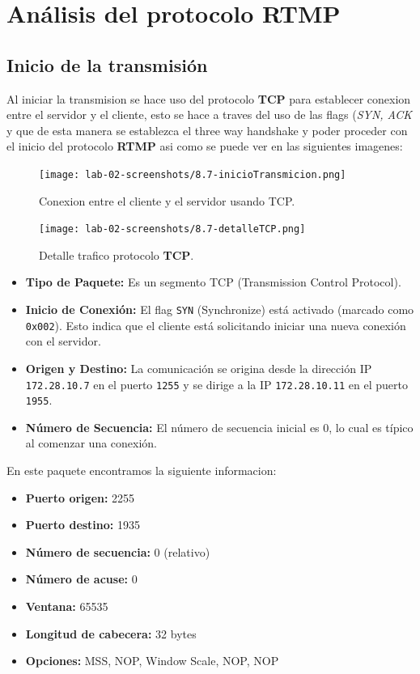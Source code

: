 \documentclass[10pt]{article}
\begin{document}
\section{Análisis del protocolo RTMP}
\subsection{Inicio de la transmisión}

Al iniciar la transmision se hace uso del protocolo \textbf{TCP} para establecer conexion entre el servidor y el cliente, esto se hace a traves del uso de las flags (\textit{SYN, ACK} y que de esta manera se establezca el three way handshake y poder proceder con el inicio del protocolo \textbf{RTMP} asi como se puede ver en las siguientes imagenes:

\begin{figure}[H]
    \centering
    \texttt{[image: lab-02-screenshots/8.7-inicioTransmicion.png]}
    \caption{Conexion entre el cliente y el servidor usando TCP.}
\end{figure}
\begin{figure}[H]
    \centering
    \texttt{[image: lab-02-screenshots/8.7-detalleTCP.png]}
    \caption{Detalle trafico protocolo \textbf{TCP}.}
\end{figure}

\begin{itemize}
    \item \textbf{Tipo de Paquete:} Es un segmento TCP (Transmission Control Protocol).
    \item \textbf{Inicio de Conexión:} El flag \texttt{SYN} (Synchronize) está activado (marcado como \texttt{0x002}). Esto indica que el cliente está solicitando iniciar una nueva conexión con el servidor.
    \item \textbf{Origen y Destino:} La comunicación se origina desde la dirección IP \texttt{172.28.10.7} en el puerto \texttt{1255} y se dirige a la IP \texttt{172.28.10.11} en el puerto \texttt{1955}.
    \item \textbf{Número de Secuencia:} El número de secuencia inicial es 0, lo cual es típico al comenzar una conexión.
\end{itemize}
En este paquete encontramos la siguiente informacion:
\begin{itemize}
    \item \textbf{Puerto origen:} 2255
    \item \textbf{Puerto destino:} 1935
    \item \textbf{Número de secuencia:} 0 (relativo)
    \item \textbf{Número de acuse:} 0
    \item \textbf{Ventana:} 65535
    \item \textbf{Longitud de cabecera:} 32 bytes
    \item \textbf{Opciones:} MSS, NOP, Window Scale, NOP, NOP
\end{itemize}
\end{document}
